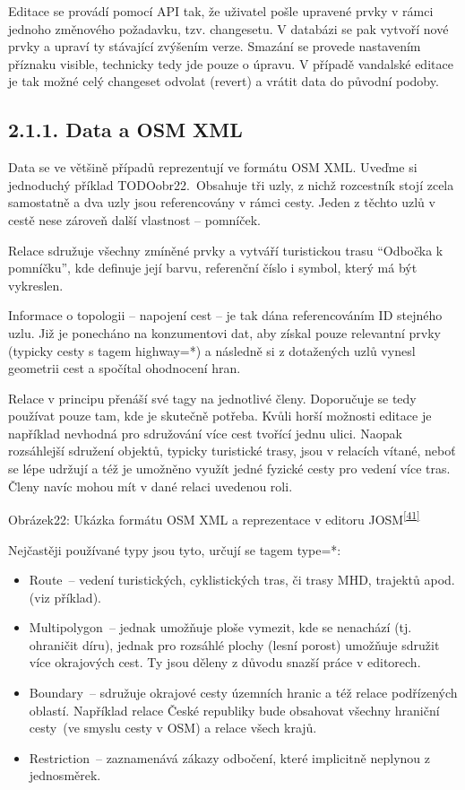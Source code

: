 Editace se provádí pomocí API tak, že uživatel pošle upravené prvky v rámci jednoho změnového požadavku, tzv. changesetu. V databázi se pak vytvoří nové prvky a upraví ty stávající zvýšením verze. Smazání se provede nastavením příznaku visible, technicky tedy jde pouze o úpravu. V případě vandalské editace je tak možné celý changeset odvolat (revert) a vrátit data do původní podoby.

\subsection{2.1.1. Data a OSM XML}\label{data-a-osm-xml}

Data se ve většině případů reprezentují ve formátu OSM XML. Uveďme si jednoduchý příklad TODOobr22.~Obsahuje tři uzly, z nichž rozcestník stojí zcela samostatně a dva uzly jsou referencovány v rámci cesty. Jeden z těchto uzlů v cestě nese zároveň další vlastnost -- pomníček.

Relace sdružuje všechny zmíněné prvky a vytváří turistickou trasu ``Odbočka k pomníčku'', kde definuje její barvu, referenční číslo i symbol, který má být vykreslen.

Informace o topologii -- napojení cest -- je tak dána referencováním ID stejného uzlu. Již je ponecháno na konzumentovi dat, aby získal pouze relevantní prvky (typicky cesty s tagem highway=*) a následně si z dotažených uzlů vynesl geometrii cest a spočítal ohodnocení hran.

Relace v principu přenáší své tagy na jednotlivé členy. Doporučuje se tedy používat pouze tam, kde je skutečně potřeba. Kvůli horší možnosti editace je například nevhodná pro sdružování více cest tvořící jednu ulici. Naopak rozsáhlejší sdružení objektů, typicky turistické trasy, jsou v relacích vítané, neboť se lépe udržují a též je umožněno využít jedné fyzické cesty pro vedení více tras. Členy navíc mohou mít v dané relaci uvedenou roli.

Obrázek22: Ukázka formátu OSM XML a reprezentace v editoru JOSM\textsuperscript{\href{}{{[}41{]}}}

Nejčastěji používané typy jsou tyto, určují se tagem type=*:

\begin{itemize}
\tightlist
\item
  Route~-- vedení turistických, cyklistických tras, či trasy MHD, trajektů apod. (viz příklad).
\item
  Multipolygon~-- jednak umožňuje ploše vymezit, kde se nenachází (tj. ohraničit díru), jednak pro rozsáhlé plochy (lesní porost) umožňuje sdružit více okrajových cest. Ty jsou děleny z důvodu snazší práce v editorech.
\item
  Boundary~-- sdružuje okrajové cesty územních hranic a též relace podřízených oblastí. Například relace České republiky bude obsahovat všechny hraniční cesty~(ve smyslu cesty v OSM) a relace všech krajů.
\item
  Restriction~-- zaznamenává zákazy odbočení, které implicitně neplynou z jednosměrek.
\end{itemize}


